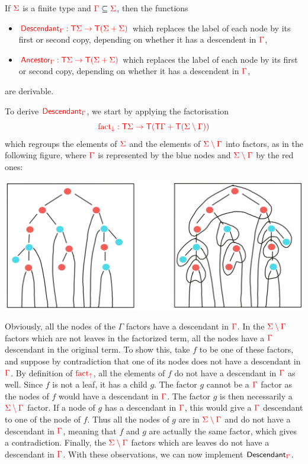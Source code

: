 \medskip
\noindent\begin{example}\label{ex:descendant} If ${\color{red}{\Sigma}}$ is a finite type and ${\color{red}{\Gamma}}\subseteq {\color{red}{\Sigma}}$, then the functions 
\begin{itemize}
\item ${\color{red}{\mathsf{Descendant}_{\color{red}{\Gamma}}: {\color{red}{\mathsf T}}{\color{red}{\Sigma}}\to {\color{red}{\mathsf T}}({\color{red}{\Sigma}}+{\color{red}{\Sigma}})}}$ which replaces the label of each node by its first or second copy, depending on whether it has a descendent in ${\color{red}{\Gamma}}$,
\item ${\color{red}{\mathsf{Ancestor}_{\color{red}{\Gamma}}: {\color{red}{\mathsf T}}{\color{red}{\Sigma}}\to {\color{red}{\mathsf T}}({\color{red}{\Sigma}}+{\color{red}{\Sigma}})}}$ which replaces the label of each node by its first or second copy, depending on whether it has a descendent in ${\color{red}{\Gamma}}$,
\end{itemize}
are derivable.

To derive ${\color{red}{\mathsf{Descendant}_{\color{red}{\Gamma}}}}$, we start by applying the factorisation $${\color{red}{{\color{red}{\mathrm{fact_{\downarrow}}}}: {\color{red}{\mathsf T}}{\color{red}{\Sigma}}\to {\color{red}{\mathsf T}}({\color{red}{\mathsf T}}{\color{red}{\Gamma}}+{\color{red}{\mathsf T}}({\color{red}{\Sigma}}\setminus{\color{red}{\Gamma}}))}}$$ which regroups the elements of ${\color{red}{\Sigma}}$ and the elements of ${\color{red}{{\color{red}{\Sigma}}\setminus{\color{red}{\Gamma}}}}$ into factors, as in the following figure, where ${\color{red}{\Gamma}}$ is represented by the blue nodes and ${\color{red}{{\color{red}{\Sigma}}\setminus {\color{red}{\Gamma}}}}$ by the red ones:
\begin{center}
\includegraphics[scale=.15]{MyPic6.jpg}
\end{center}
Obviously, all the nodes of the $\Gamma$ factors have a descendant in ${\color{red}{\Gamma}}$. 
In the ${\color{red}{{\color{red}{\Sigma}}\setminus{\color{red}{\Gamma}}}}$ factors which are not leaves in the factorized term, all the nodes have a ${\color{red}{\Gamma}}$ descendant in the original term. To show this, take $f$ to be one of these factors, and suppose by contradiction that one of its nodes does not have a descendant in ${\color{red}{\Gamma}}$. By definition of ${\color{red}{\mathrm{fact_{\uparrow}}}}$, all the elements of $f$ do not have a descendant in ${\color{red}{\Gamma}}$ as well. Since $f$ is not a leaf, it has a child $g$. The factor $g$ cannot be a ${\color{red}{\Gamma}}$
factor as the nodes of $f$ would have a descendant in ${\color{red}{\Gamma}}$. The factor $g$ is then necessarily  a ${\color{red}{{\color{red}{\Sigma}}\setminus {\color{red}{\Gamma}}}}$ factor. If a node of $g$ has a descendant in ${\color{red}{\Gamma}}$, this would give a ${\color{red}{\Gamma}}$ descendant to one of the node of $f$. Thus all the nodes of $g$ are in ${\color{red}{{\color{red}{\Sigma}}\setminus {\color{red}{\Gamma}}}}$ and do not have a descendant in ${\color{red}{\Gamma}}$, meaning that $f$ and $g$ are actually the same factor, which gives a contradiction. Finally, the ${\color{red}{{\color{red}{\Sigma}}\setminus{\color{red}{\Gamma}}}}$ factors which are leaves do not have a descendant in ${\color{red}{\Gamma}}$. With these observations, we can now implement $\mathsf{Descendant}_{\color{red}{\Gamma}}$. 


\end{example}
